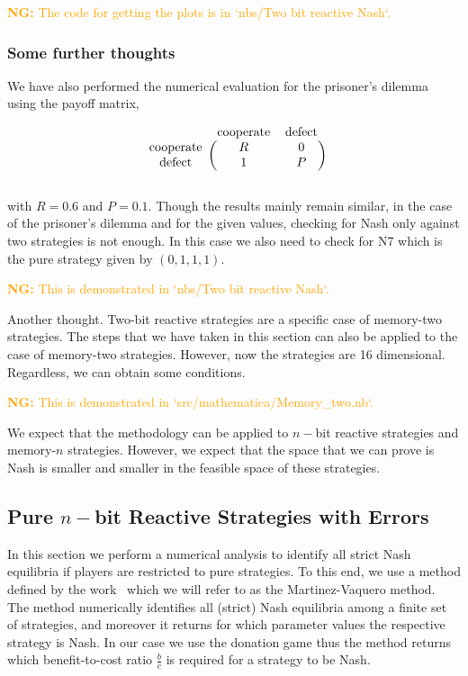 \documentclass{article}
\theoremstyle{definition}
\newcommand{\nikoleta}[1]{\textcolor{orange}{{\bf NG:} #1}}
\begin{document}
\nikoleta{The code for getting the plots is in `nbs/Two bit reactive Nash`.}

\subsubsection{Some further thoughts}

We have also performed the numerical evaluation for the prisoner's dilemma using
the payoff matrix,

\begin{equation}
  \begin{blockarray}{ccc}
      & \text{cooperate} & \text{defect} \\
      \begin{block}{c(cc)}
          \text{cooperate} & R & 0 \\
          \text{defect} & 1 & P \\
      \end{block}
  \end{blockarray}
\end{equation}

with \(R=0.6\) and \(P=0.1\). Though the results mainly remain similar, in the
case of the prisoner's dilemma and for the given values, checking for Nash only
against two strategies is not enough. In this case we also need to check for N7
which is the pure strategy given by \((0, 1, 1, 1)\).

\nikoleta{This is demonstrated in `nbs/Two bit reactive Nash`.}

Another thought. Two-bit reactive strategies are a specific case of memory-two
strategies. The steps that we have taken in this section can also be applied to
the case of memory-two strategies. However, now the strategies are 16
dimensional. Regardless, we can obtain some conditions.

\nikoleta{This is demonstrated in `src/mathematica/Memory\_two.nb`.}

We expect that the methodology can be applied to \(n-\)bit reactive strategies
and memory-\(n\) strategies. However, we expect that the space that we can prove
is Nash is smaller and smaller in the feasible space of these strategies.

\subsection{Pure \(n-\)bit Reactive Strategies with Errors}\label{section:pure_strategies}

In this section we perform a numerical analysis to identify all strict Nash
equilibria if players are restricted to pure strategies. To this end, we use a
method defined by the work~\citep{hilbe:PNAS:2017} which we will refer to as the
Martinez-Vaquero method. The method numerically identifies all (strict) Nash equilibria
among a finite set of strategies, and moreover it returns for which parameter
values the respective strategy is Nash. In our case we use the donation game
thus the method returns which benefit-to-cost ratio \(\frac{b}{c}\) is required
for a strategy to be Nash.
\end{document}
